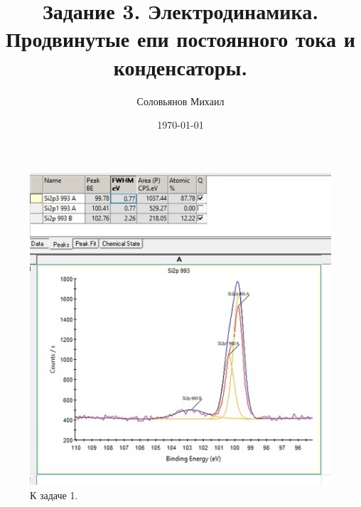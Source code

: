 \documentclass[a4paper,12pt]{article} %
\author{Соловьянов Михаил }
\title{Задание 3. Электродинамика. Продвинутые епи постоянного тока и конденсаторы.}
\date{\today}
\begin{document}
\maketitle

\begin{figure}[H]
\centering
  \includegraphics[width=0.5\linewidth]{1.jpg}
  \caption{К задаче 1.}
  \label{fig1}
\end{figure}
\end{document}

